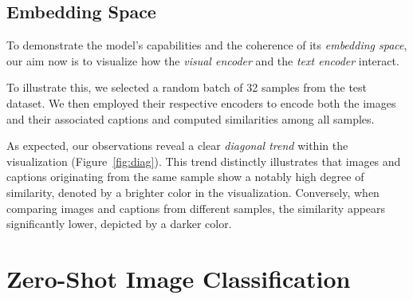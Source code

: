 \documentclass[10pt,twocolumn,letterpaper]{article}
\begin{document}
\subsection{Embedding Space}

To demonstrate the model's capabilities and the coherence of its \textit{embedding space}, our aim now is to visualize how the \textit{visual encoder} and the \textit{text encoder} interact. %

To illustrate this, we selected a random batch of 32 samples from the test dataset.
We then employed their respective encoders to encode both the images and their associated captions and computed similarities among all samples.


As expected, our observations reveal a clear \textit{diagonal trend} within the visualization (Figure\ \ref{fig:diag}).
This trend distinctly illustrates that images and captions originating from the same sample show a notably high degree of similarity, denoted by a brighter color in the visualization.
Conversely, when comparing images and captions from different samples, the similarity appears significantly lower, depicted by a darker color.


\section{Zero-Shot Image Classification}
\end{document}
